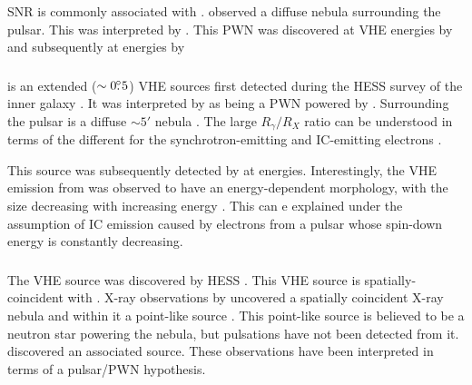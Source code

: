 \subsubsection{\mshfifteenfiftytwo}

\ac{SNR}
\citep[\mshfifteenfiftytwo][]{caswell_1981a_high-resolution-radio} is
commonly associated with  \citep{seward_1982a_x-ray-pulsar}.
\cite{seward_1982a_x-ray-pulsar} observed a diffuse nebula surrounding the
pulsar. This was interpreted by \cite{trussoni_1996a_rosat-observations}.
This \ac{PWN} was discovered at \ac{VHE} energies by
\cite{aharonian_2005a_discovery-extended} and subsequently at \gev
energies by \cite{abdo_2010a_detection-energetic}

\subsubsection{}

 is an extended ($\sim0\mbox{$.\!\!^\circ$}5$) \ac{VHE} sources
first detected during the \ac{HESS} survey of the inner
galaxy \citep{aharonian_2006a_h.e.s.s.-survey}.  It was
interpreted by \cite{aharonian_2005a_possible-association}
as being a \ac{PWN} powered by  \citep[also known as
,][]{clifton_1992a_high-frequency-survey}.  Surrounding the
pulsar is a diffuse $\sim 5'$ nebula \cite{finley_1996a_morphology-young}.
The large $R_\gamma/R_X$ ratio can be understood in terms of the
different for the synchrotron-emitting and \ac{IC}-emitting electrons
\citep{aharonian_2006a_h.e.s.s.-survey}.

This source was subsequently detected by
\cite{grondin_2011a_detection-pulsar} at \gev energies.  Interestingly,
the \ac{VHE} emission from  was observed to have an
energy-dependent morphology, with the size decreasing with increasing
energy \citep{aharonian_2006a_energy-dependent}.  This can e explained
under the assumption of \ac{IC} emission caused by electrons from a
pulsar whose spin-down energy is constantly decreasing.

\subsubsection{}

The \ac{VHE} source  was discovered by
\ac{HESS} \citep{aharonian_2006a_h.e.s.s.-survey}.  This
\ac{VHE} source is spatially-coincident with 
\citep{shaver_1970a_galactic-radio}.  X-ray observations by
\xmmnewton uncovered a spatially coincident X-ray nebula and within it
a point-like source \cite{funk_2007a_xmm-newton-observations}.
This point-like source is believed to be a neutron star powering the
nebula, but pulsations have not been detected from it.
\cite{slane_2010_fermi-detection} discovered an associated \gev source.
These observations have been interpreted in terms of a pulsar/\ac{PWN}
hypothesis.


